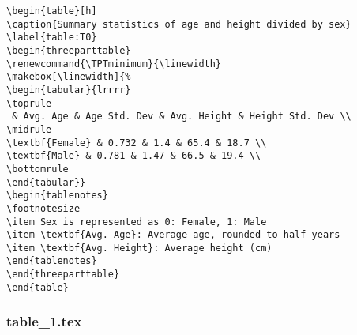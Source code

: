 \documentclass[11pt]{article}
\begin{document}
\begin{Verbatim}[tabsize=4]
\begin{table}[h]
\caption{Summary statistics of age and height divided by sex}
\label{table:T0}
\begin{threeparttable}
\renewcommand{\TPTminimum}{\linewidth}
\makebox[\linewidth]{%
\begin{tabular}{lrrrr}
\toprule
 & Avg. Age & Age Std. Dev & Avg. Height & Height Std. Dev \\
\midrule
\textbf{Female} & 0.732 & 1.4 & 65.4 & 18.7 \\
\textbf{Male} & 0.781 & 1.47 & 66.5 & 19.4 \\
\bottomrule
\end{tabular}}
\begin{tablenotes}
\footnotesize
\item Sex is represented as 0: Female, 1: Male
\item \textbf{Avg. Age}: Average age, rounded to half years
\item \textbf{Avg. Height}: Average height (cm)
\end{tablenotes}
\end{threeparttable}
\end{table}

\end{Verbatim}

\subsubsection*{table\_1.tex}
\end{document}
